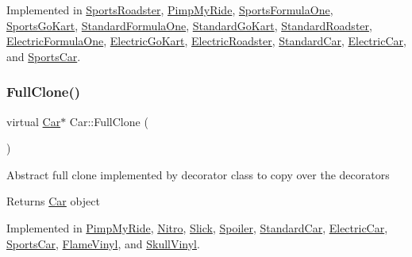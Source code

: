 Implemented in \mbox{\hyperlink{class_sports_roadster_a2f6df8bfdb8a28c413dbd976de77f68a}{Sports\+Roadster}}, \mbox{\hyperlink{class_pimp_my_ride_a37648eb844eb3e5967d0d3a6a8f0469d}{Pimp\+My\+Ride}}, \mbox{\hyperlink{class_sports_formula_one_aba368f668094ef50d94c29acd739fcbe}{Sports\+Formula\+One}}, \mbox{\hyperlink{class_sports_go_kart_abff0ab942e347968f49a3ebf600b19fe}{Sports\+Go\+Kart}}, \mbox{\hyperlink{class_standard_formula_one_acd27c9ec96a7410d40c72666d36b6a7e}{Standard\+Formula\+One}}, \mbox{\hyperlink{class_standard_go_kart_aec5a6e2e21ab80b0ee072bbcdcf0323a}{Standard\+Go\+Kart}}, \mbox{\hyperlink{class_standard_roadster_aa4aa69bc59c2095faae2fbc7de12798d}{Standard\+Roadster}}, \mbox{\hyperlink{class_electric_formula_one_ac1649c11b48ceae7a98ccbc0d4727e7c}{Electric\+Formula\+One}}, \mbox{\hyperlink{class_electric_go_kart_a56f6b0c5a68597601f27818f10862bcb}{Electric\+Go\+Kart}}, \mbox{\hyperlink{class_electric_roadster_a4ef7c42355752e28cd2ad97ed1efc047}{Electric\+Roadster}}, \mbox{\hyperlink{class_standard_car_a2fd5dd06bebd68db247bab73bd2176be}{Standard\+Car}}, \mbox{\hyperlink{class_electric_car_a852de7d2208dea4d45a554d9270508d0}{Electric\+Car}}, and \mbox{\hyperlink{class_sports_car_a4daa739baaee9d9d5ad33f4766ec43ec}{Sports\+Car}}.

\mbox{\label{class_car_a6e32b3e8ddaaf2b3873c849e42f6a085}} 
\subsubsection{\texorpdfstring{Full\+Clone()}{FullClone()}}
{\footnotesize\ttfamily virtual \mbox{\hyperlink{class_car}{Car}}$\ast$ Car\+::\+Full\+Clone (\begin{DoxyParamCaption}{ }\end{DoxyParamCaption})\hspace{0.3cm}{\ttfamily [pure virtual]}}

Abstract full clone implemented by decorator class to copy over the decorators \begin{DoxyReturn}{Returns}
\mbox{\hyperlink{class_car}{Car}} object 
\end{DoxyReturn}


Implemented in \mbox{\hyperlink{class_pimp_my_ride_afce12a1a761727eebec707924521d0e2}{Pimp\+My\+Ride}}, \mbox{\hyperlink{class_nitro_a1574264a8ca8691bb3669c8a3a3ad5dd}{Nitro}}, \mbox{\hyperlink{class_slick_a09178f75aaba34e79992c66eac80974e}{Slick}}, \mbox{\hyperlink{class_spoiler_a240c57673fae69ffa9cf51468ca17793}{Spoiler}}, \mbox{\hyperlink{class_standard_car_a4fda894219093e86a4c9b1eeb0edc523}{Standard\+Car}}, \mbox{\hyperlink{class_electric_car_a97eec3669ad8f20128eaab3084f8f8f5}{Electric\+Car}}, \mbox{\hyperlink{class_sports_car_a55002e6cf1f09b4a5d0e4c59c938e3a5}{Sports\+Car}}, \mbox{\hyperlink{class_flame_vinyl_a10356b9fab01a74d2354773e0beaba8b}{Flame\+Vinyl}}, and \mbox{\hyperlink{class_skull_vinyl_a02a74e1366553be8263a5751239bb8bf}{Skull\+Vinyl}}.

